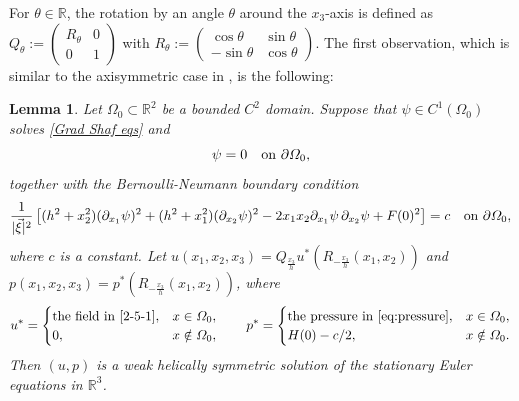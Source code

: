 \documentclass[12pt,reqno]{amsart}
\numberwithin{equation}{section}
\newtheorem{lemma}[theorem]{Lemma}
\theoremstyle{definition}
\theoremstyle{remark}
\begin{document}
For $ \theta\in\mathbb{R} $,   the rotation by an angle $\theta$ around the $x_3$-axis is defined as $ Q_\theta:=\begin{pmatrix}
R_\theta & 0  \\
0 & 1
\end{pmatrix} $ with $ R_\theta:=\begin{pmatrix}
\cos\theta & \sin\theta  \\
-\sin\theta &\cos\theta
\end{pmatrix}. $
The first observation, which is similar to the axisymmetric case in \cite{DominguezVazquezEncisoPeraltaSalas2021}, is the following:
\begin{lemma}\label{lem:overdet}
	Let $\varOmega_0\subset\mathbb{R}^2$ be a bounded $C^2$ domain.  Suppose that $\psi\in C^1(\varOmega_0)$ solves \eqref{Grad Shaf eqs} and
	\begin{equation}\label{eq:dirichlet}
	\psi=0\quad\hbox{on }\partial\varOmega_0,
	\end{equation}
	together with the   Bernoulli-Neumann boundary condition
	\begin{equation}\label{eq:bernoulli-bc}
	\frac1{|\vec{\xi}|^2}
	\left[(h^2+x_2^2)(\partial_{x_1}\psi)^2+(h^2+x_1^2)(\partial_{x_2}\psi)^2
	-2x_1x_2\partial_{x_1}\psi\,\partial_{x_2}\psi+F(0)^2\right]=c 
	\quad\hbox{on }\partial\varOmega_0,
	\end{equation}
where $ c $ is a constant.	Let $u(x_1,x_2,x_3)=Q_{\frac{x_3}{h}}u^*\left (R_{-\frac{x_3}{h}}(x_1,x_2)\right )$ and $ p(x_1,x_2,x_3)=p^*\left (R_{-\frac{x_3}{h}}(x_1,x_2)\right )$, where
	\begin{equation*}%
	u^*=\begin{cases}
	\hbox{the field in \eqref{2-5-1}},&x\in\varOmega_0,\\
	0,&x\notin\varOmega_0,
	\end{cases}
	\qquad
	p^*=\begin{cases}
	\hbox{the pressure in \eqref{eq:pressure}},&x\in\varOmega_0,\\
	H(0)-c/2,&x\notin\varOmega_0.
	\end{cases}
	\end{equation*}
	Then $ (u,p) $ is a weak helically symmetric solution of the stationary Euler equations in $\mathbb{R}^3$.
\end{lemma}
\end{document}
